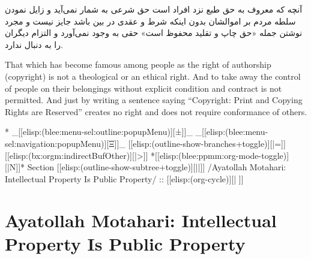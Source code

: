 \begin{whenOrg}
\begin{verblatex}
\begin{frame}[fragile,plain,label=ayatollahKhomeini]
\RTL
  \begin{faPar}


آنچه كه معروف به حق طبع نزد افراد است حق شرعی به شمار نمی‌آید و زایل نمودن سلطه مردم بر
اموالشان بدون اینكه شرط و عقدی در بین باشد جایز نیست و مجرد نوشتن جمله «حق چاپ و تقلید
محفوظ است» حقی به وجود نمی‌آورد و التزام دیگران را به دنبال ندارد.

  \end{faPar}
\LTR

  \bigskip


  That which has become famous among people as the
  right of authorship (copyright) is not a theological or an
  ethical right.
  And to take away the control of people on their
  belongings without explicit condition and contract is not
  permitted. And just by writing a sentence saying ``Copyright: Print and Copying Rights are Reserved''
  creates no right and does not require conformance of others.




\end{frame}
\end{verblatex}


\begin{whenOrg}
*  _[[elisp:(blee:menu-sel:outline:popupMenu)][±]]_ _[[elisp:(blee:menu-sel:navigation:popupMenu)][Ξ]]_ [[elisp:(outline-show-branches+toggle)][|=]] [[elisp:(bx:orgm:indirectBufOther)][|>]] *[[elisp:(blee:ppmm:org-mode-toggle)][|N]]*  Section    [[elisp:(outline-show-subtree+toggle)][||]]   /Ayatollah Motahari: Intellectual Property Is Public Property/ ::  [[elisp:(org-cycle)][| ]]
\end{whenOrg}

\section{Ayatollah Motahari: Intellectual Property Is Public Property}



\end{whenOrg}
